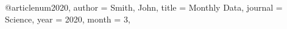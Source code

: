 @article{num2020,
  author = {Smith, John},
  title = {Monthly Data},
  journal = {Science},
  year = {2020},
  month = {3},
}

